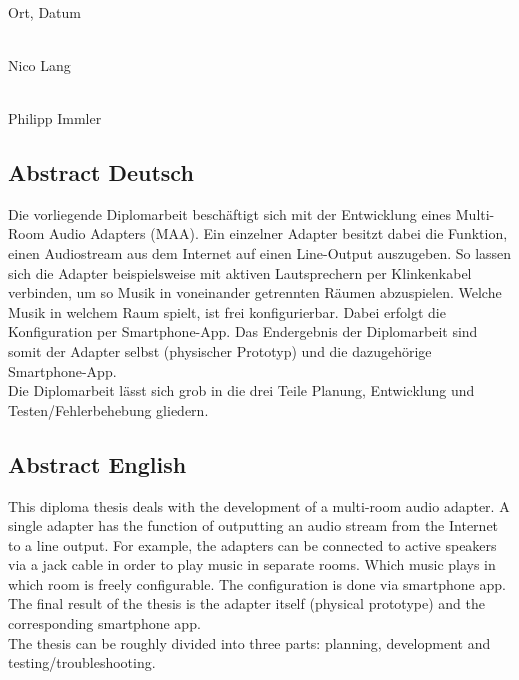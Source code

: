 \documentclass[11pt, twoside]{article}
\begin{document}
\vspace{30mm}

\noindent
\begin{minipage}[c]{5cm}
	\centering \dotfill \\
	Ort, Datum
\end{minipage}
\hfill
    \begin{minipage}[c]{5cm}
        \centering \dotfill \\
        Nico Lang
    \end{minipage}
    
\vspace{25mm}

\noindent
\begin{flushright}
    \begin{minipage}[c]{5cm}
        \centering \dotfill \\
        Philipp Immler
    \end{minipage}
\end{flushright}

\newpage

\subsection*{Abstract Deutsch}
Die vorliegende Diplomarbeit beschäftigt sich mit der Entwicklung eines Multi-Room Audio Adapters (MAA). Ein einzelner Adapter besitzt dabei die Funktion, einen Audiostream aus dem Internet auf einen Line-Output auszugeben. So lassen sich die Adapter beispielsweise mit aktiven Lautsprechern per Klinkenkabel verbinden, um so Musik in voneinander getrennten Räumen abzuspielen. Welche Musik in welchem Raum spielt, ist frei konfigurierbar. Dabei erfolgt die Konfiguration per Smartphone-App. Das Endergebnis der Diplomarbeit sind somit der Adapter selbst (physischer Prototyp) und die dazugehörige Smartphone-App. \newline \\
Die Diplomarbeit lässt sich grob in die drei Teile Planung, Entwicklung und Testen/Fehlerbehebung gliedern.
\subsection*{Abstract English}
This diploma thesis deals with the development of a multi-room audio adapter. A single adapter has the function of outputting an audio stream from the Internet to a line output. For example, the adapters can be connected to active speakers via a jack cable in order to play music in separate rooms. Which music plays in which room is freely configurable. The configuration is done via smartphone app. The final result of the thesis is the adapter itself (physical prototype) and the corresponding smartphone app. \newline \\
The thesis can be roughly divided into three parts: planning, development and testing/troubleshooting.
\end{document}

